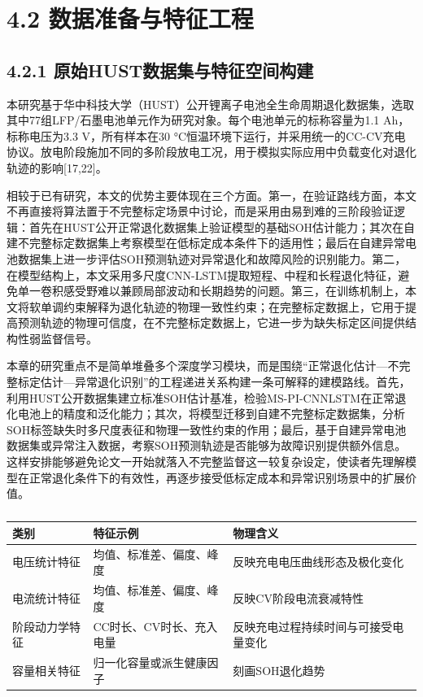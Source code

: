 \documentclass[12pt, a4paper]{ctexart}
\begin{document}
\section{4.2 数据准备与特征工程}


\subsection{4.2.1 原始HUST数据集与特征空间构建}

本研究基于华中科技大学（HUST）公开锂离子电池全生命周期退化数据集，选取其中77组LFP/石墨电池单元作为研究对象。每个电池单元的标称容量为1.1 Ah，标称电压为3.3 V，所有样本在30 °C恒温环境下运行，并采用统一的CC-CV充电协议。放电阶段施加不同的多阶段放电工况，用于模拟实际应用中负载变化对退化轨迹的影响[17,22]。


相较于已有研究，本文的优势主要体现在三个方面。第一，在验证路线方面，本文不再直接将算法置于不完整标定场景中讨论，而是采用由易到难的三阶段验证逻辑：首先在HUST公开正常退化数据集上验证模型的基础SOH估计能力；其次在自建不完整标定数据集上考察模型在低标定成本条件下的适用性；最后在自建异常电池数据集上进一步评估SOH预测轨迹对异常退化和故障风险的识别能力。第二，在模型结构上，本文采用多尺度CNN-LSTM提取短程、中程和长程退化特征，避免单一卷积感受野难以兼顾局部波动和长期趋势的问题。第三，在训练机制上，本文将软单调约束解释为退化轨迹的物理一致性约束；在完整标定数据上，它用于提高预测轨迹的物理可信度，在不完整标定数据上，它进一步为缺失标定区间提供结构性弱监督信号。



本章的研究重点不是简单堆叠多个深度学习模块，而是围绕“正常退化估计—不完整标定估计—异常退化识别”的工程递进关系构建一条可解释的建模路线。首先，利用HUST公开数据集建立标准SOH估计基准，检验MS-PI-CNNLSTM在正常退化电池上的精度和泛化能力；其次，将模型迁移到自建不完整标定数据集，分析SOH标签缺失时多尺度表征和物理一致性约束的作用；最后，基于自建异常电池数据集或异常注入数据，考察SOH预测轨迹是否能够为故障识别提供额外信息。这样安排能够避免论文一开始就落入不完整监督这一较复杂设定，使读者先理解模型在正常退化条件下的有效性，再逐步接受低标定成本和异常识别场景中的扩展价值。




\begin{table}[H]
  \centering
  \begin{tabular}{lll}
  \toprule
  类别 & 特征示例 & 物理含义 \\
  \midrule
  电压统计特征 & 均值、标准差、偏度、峰度 & 反映充电电压曲线形态及极化变化 \\
  电流统计特征 & 均值、标准差、偏度、峰度 & 反映CV阶段电流衰减特性 \\
  阶段动力学特征 & CC时长、CV时长、充入电量 & 反映充电过程持续时间与可接受电量变化 \\
  容量相关特征 & 归一化容量或派生健康因子 & 刻画SOH退化趋势 \\
  \bottomrule
  \end{tabular}
  \caption{}
  \label{tab:}
\end{table}
\end{document}
